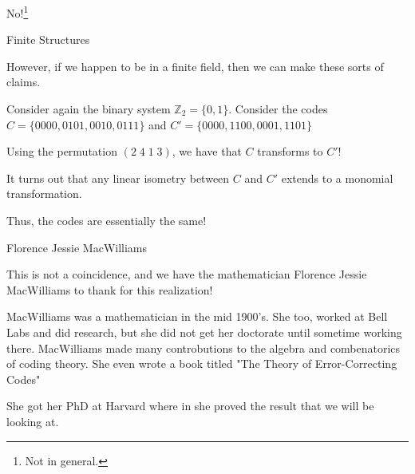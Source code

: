 \documentclass{beamer}
\begin{document}
\begin{frame}
    
    \begin{center}
        No!\footnote{Not in general.}
    \end{center}

\end{frame}

\begin{frame}{Finite Structures}
    
    However, if we happen to be in a finite field, then we can make these sorts of claims.

    \medskip

    Consider again the binary system $\mathbb{Z}_2=\{0,1\}$. Consider the codes
    $C=\{0000,0101,0010,0111\}$ and $C'=\{0000,1100,0001,1101\}$

    \medskip

    Using the permutation $(2\;4\;1\;3)$, we have that $C$ transforms to $C'$!
    
    \bigskip

    \pause

    It turns out that any linear isometry between $C$ and $C'$ extends to a monomial transformation.\\

    \pause

    Thus, the codes are essentially the same!

\end{frame}

\begin{frame}{Florence Jessie MacWilliams}
    
    This is not a coincidence, and we have the mathematician Florence Jessie MacWilliams to thank for
    this realization!

    \medskip
    
    \pause

    MacWilliams was a mathematician in the mid 1900's. She too, worked at Bell Labs and did research,
    but she did not get her doctorate until sometime working there. MacWilliams made many controbutions
    to the algebra and combenatorics of coding theory. She even wrote a book titled "The Theory of
    Error-Correcting Codes"
    
    \bigskip

    She got her PhD at Harvard where in she proved the result that we will be looking at.

\end{frame}
\end{document}

